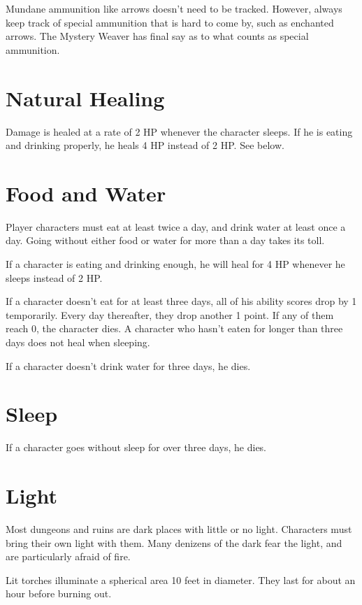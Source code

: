 \begin{multicols}{2}
Mundane ammunition like arrows doesn't need to be tracked. However, always
keep track of special ammunition that is hard to come by, such as enchanted
arrows. The Mystery Weaver has final say as to what counts as special ammunition.

\section{Natural Healing}

Damage is healed at a rate of 2 HP whenever the character sleeps. If he is
eating and drinking properly, he heals 4 HP instead of 2 HP. See below.

\section{Food and Water}

Player characters must eat at least twice a day, and drink water at least
once a day. Going without either food or water for more than a day takes its
toll.

If a character is eating and drinking enough, he will heal for 4 HP whenever
he sleeps instead of 2 HP.

If a character doesn't eat for at least three days, all of his ability scores
drop by 1 temporarily. Every day thereafter, they drop another 1 point. If
any of them reach 0, the character dies. A character who hasn't eaten for
longer than three days does not heal when sleeping.

If a character doesn't drink water for three days, he dies.

\section{Sleep}

If a character goes without sleep for over three days, he dies.

\section{Light}

Most dungeons and ruins are dark places with little or no light. Characters
must bring their own light with them. Many denizens of the dark fear the
light, and are particularly afraid of fire.

Lit torches illuminate a spherical area 10 feet in diameter. They last for
about an hour before burning out.


\end{multicols}
